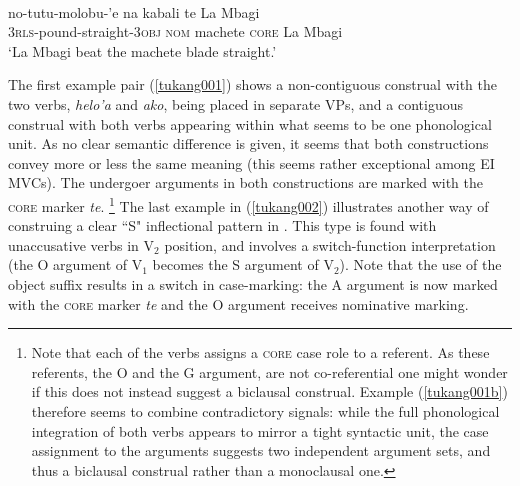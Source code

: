 \ea \label{tukang002}
\\
\gll no-tutu-molobu-'e na kabali te La Mbagi \\
3\textsc{rls}-pound-straight-3\textsc{obj} \textsc{nom} machete \textsc{core} La Mbagi \\
\glft `La Mbagi beat the machete blade straight.' \\ 
\z

The first example pair (\ref{tukang001}) shows a non-contiguous construal with the two verbs, \textit{helo'a} and \textit{ako}, being placed in separate VPs, and a contiguous construal with both verbs appearing within what seems to be one phonological unit. As no clear semantic difference is given, it seems that both constructions convey more or less the same meaning (this seems rather exceptional among EI MVCs). The undergoer arguments in both constructions are marked with the \textsc{core} marker \textit{te}. \footnote{Note that each of the verbs assigns a \textsc{core} case role to a referent. As these referents, the O and the G argument, are not co-referential one might wonder if this does not instead suggest a biclausal construal. Example (\ref{tukang001b}) therefore seems to combine contradictory signals: while the full phonological integration of both verbs appears to mirror a tight syntactic unit, the case assignment to the arguments suggests two independent argument sets, and thus a biclausal construal rather than a monoclausal one.} The last example in (\ref{tukang002}) illustrates another way of construing a clear ``S" inflectional pattern in . This type is found with unaccusative verbs in V$_2$ position, and involves a switch-function interpretation (the O argument of V$_1$ becomes the S argument of V$_2$). Note that the use of the object suffix results in a switch in case-marking: the A argument is now marked with the \textsc{core} marker \textit{te} and the O argument receives nominative marking.

